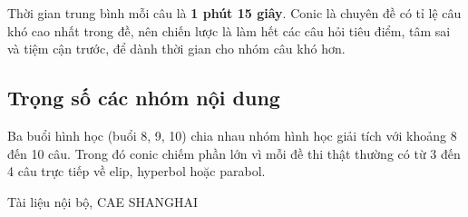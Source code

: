 \documentclass[11pt, a4paper]{article}
\begin{document}
Thời gian trung bình mỗi câu là \textbf{1 phút 15 giây}. Conic là chuyên đề có tỉ lệ câu khó cao nhất trong đề, nên chiến lược là làm hết các câu hỏi tiêu điểm, tâm sai và tiệm cận trước, để dành thời gian cho nhóm câu khó hơn.

\subsection{Trọng số các nhóm nội dung}


Ba buổi hình học (buổi 8, 9, 10) chia nhau nhóm hình học giải tích với khoảng 8 đến 10 câu. Trong đó conic chiếm phần lớn vì mỗi đề thi thật thường có từ 3 đến 4 câu trực tiếp về elip, hyperbol hoặc parabol.
\vspace{0.8cm}
\begin{center}
{\footnotesize\color{cae_blue} Tài liệu nội bộ, CAE SHANGHAI}
\end{center}
\end{document}
